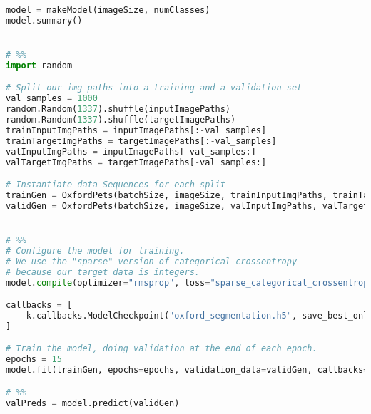 \begin{lstlisting}[language=python]
model = makeModel(imageSize, numClasses)
model.summary()


# %%
import random

# Split our img paths into a training and a validation set
val_samples = 1000
random.Random(1337).shuffle(inputImagePaths)
random.Random(1337).shuffle(targetImagePaths)
trainInputImgPaths = inputImagePaths[:-val_samples]
trainTargetImgPaths = targetImagePaths[:-val_samples]
valInputImgPaths = inputImagePaths[-val_samples:]
valTargetImgPaths = targetImagePaths[-val_samples:]

# Instantiate data Sequences for each split
trainGen = OxfordPets(batchSize, imageSize, trainInputImgPaths, trainTargetImgPaths)
validGen = OxfordPets(batchSize, imageSize, valInputImgPaths, valTargetImgPaths)


# %%
# Configure the model for training.
# We use the "sparse" version of categorical_crossentropy
# because our target data is integers.
model.compile(optimizer="rmsprop", loss="sparse_categorical_crossentropy")

callbacks = [
    k.callbacks.ModelCheckpoint("oxford_segmentation.h5", save_best_only=True)
]

# Train the model, doing validation at the end of each epoch.
epochs = 15
model.fit(trainGen, epochs=epochs, validation_data=validGen, callbacks=callbacks)

# %%
valPreds = model.predict(validGen)

\end{lstlisting}